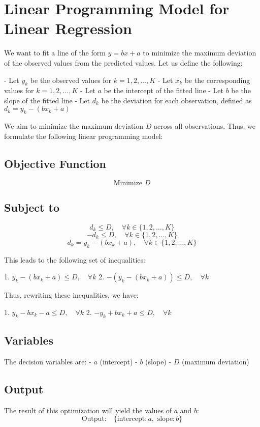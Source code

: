 \documentclass{article}
\begin{document}
\section*{Linear Programming Model for Linear Regression}

We want to fit a line of the form \( y = bx + a \) to minimize the maximum deviation of the observed values from the predicted values. Let us define the following:

- Let \( y_k \) be the observed values for \( k = 1, 2, \ldots, K \)
- Let \( x_k \) be the corresponding values for \( k = 1, 2, \ldots, K \)
- Let \( a \) be the intercept of the fitted line
- Let \( b \) be the slope of the fitted line
- Let \( d_k \) be the deviation for each observation, defined as \( d_k = y_k - (bx_k + a) \)

We aim to minimize the maximum deviation \( D \) across all observations. Thus, we formulate the following linear programming model:

\subsection*{Objective Function}

\[
\text{Minimize } D
\]

\subsection*{Subject to}

\[
d_k \leq D, \quad \forall k \in \{1, 2, \ldots, K\}
\]
\[
-d_k \leq D, \quad \forall k \in \{1, 2, \ldots, K\}
\]
\[
d_k = y_k - (bx_k + a), \quad \forall k \in \{1, 2, \ldots, K\}
\]

This leads to the following set of inequalities:

1. \( y_k - (bx_k + a) \leq D, \quad \forall k \)
2. \( -(y_k - (bx_k + a)) \leq D, \quad \forall k \)

Thus, rewriting these inequalities, we have:

1. \( y_k - bx_k - a \leq D, \quad \forall k \)
2. \( -y_k + bx_k + a \leq D, \quad \forall k \)

\subsection*{Variables}

The decision variables are:
- \( a \) (intercept)
- \( b \) (slope)
- \( D \) (maximum deviation)

\subsection*{Output}

The result of this optimization will yield the values of \( a \) and \( b \):
\[
\text{Output:} \quad \{ \text{intercept}: a, \text{ slope}: b \}
\]
\end{document}
